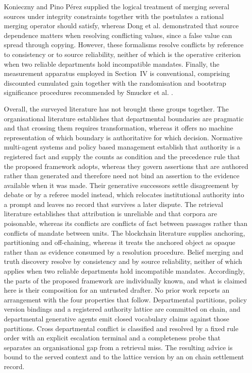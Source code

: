 \documentclass[journal]{IEEEtran}
\begin{document}
Konieczny and Pino P\'erez \cite{konieczny2002merging} supplied the logical treatment of merging several sources under integrity constraints together with the postulates a rational merging operator should satisfy, whereas Dong et al. \cite{dong2009conflicting} demonstrated that source dependence matters when resolving conflicting values, since a false value can spread through copying. However, these formalisms resolve conflicts by reference to consistency or to source reliability, neither of which is the operative criterion when two reliable departments hold incompatible mandates. Finally, the measurement apparatus employed in Section~IV is conventional, comprising discounted cumulated gain \cite{jarvelin2002ndcg} together with the randomisation and bootstrap significance procedures recommended by Smucker et al. \cite{smucker2007significance}.

Overall, the surveyed literature has not brought these groups together. The organisational literature establishes that departmental boundaries are pragmatic and that crossing them requires transformation, whereas it offers no machine representation of which boundary is authoritative for which decision. Normative multi-agent systems and policy based management establish that authority is a registered fact and supply the counts as condition and the precedence rule that the proposed framework adopts, whereas they govern assertions that are authored rather than generated and therefore need not bind an assertion to the evidence available when it was made. Their generative successors settle disagreement by debate or by a referee model instead, which relocates institutional authority into a prompt and leaves no record that survives a later dispute. The retrieval literature establishes that attribution is unreliable and that corpora are poisonable, whereas its conflicts are conflicts of fact between passages rather than conflicts of mandate between units. The blockchain literature supplies anchoring, partitioning and off-chaining, whereas it treats the anchored object as opaque rather than as evidence consumed by a resolution procedure. Belief merging and truth discovery resolve by consistency and by source reliability, neither of which applies when two reliable departments hold incompatible mandates. Accordingly, the parts of the proposed framework are individually known, and what is claimed here is their composition for an untrusted drafter. No prior work reports an arrangement with the four properties that follow. Departmental partitions, policy version bindings and a registered authority lattice are committed on chain, and departmental generative agents emit closed vocabulary claims against those partitions. Cross departmental conflict is classified and resolved by a fixed rule order with an explicit escalation terminal and a completeness probe that separates an organisational gap from a retrieval miss. The resulting advice is bound to the served context and to the lattice version by an on chain settlement record.
\end{document}
